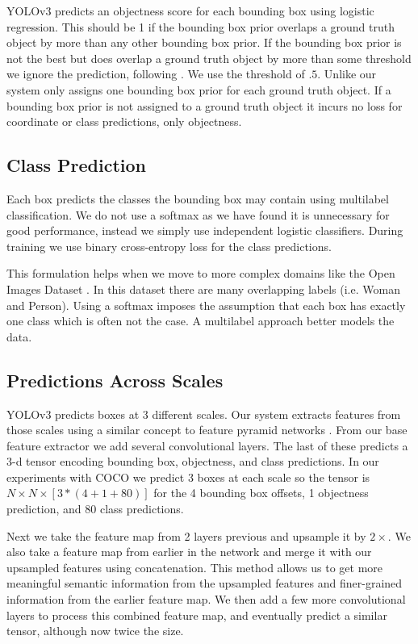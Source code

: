 YOLOv3 predicts an objectness score for each bounding box using logistic regression. This should be 1 if the bounding box prior overlaps a ground truth object by more than any other bounding box prior. If the bounding box prior is not the best but does overlap a ground truth object by more than some threshold we ignore the prediction, following \cite{ren2015faster}. We use the threshold of $.5$. Unlike \cite{ren2015faster} our system only assigns one bounding box prior for each ground truth object. If a bounding box prior is not assigned to a ground truth object it incurs no loss for coordinate or class predictions, only objectness.

\subsection{Class Prediction}

Each box predicts the classes the bounding box may contain using multilabel classification. We do not use a softmax as we have found it is unnecessary for good performance, instead we simply use independent logistic classifiers. During training we use binary cross-entropy loss for the class predictions.

This formulation helps when we move to more complex domains like the Open Images Dataset \cite{openimages}. In this dataset there are many overlapping labels (i.e. Woman and Person). Using a softmax imposes the assumption that each box has exactly one class which is often not the case. A multilabel approach better models the data.

\subsection{Predictions Across Scales}

YOLOv3 predicts boxes at 3 different scales. Our system extracts features from those scales using a similar concept to feature pyramid networks \cite{lin2017feature}. From our base feature extractor we add several convolutional layers. The last of these predicts a 3-d tensor encoding bounding box, objectness, and class predictions. In our experiments with COCO \cite{lin2014microsoft} we predict 3 boxes at each scale so the tensor is $N\times N\times [3*(4+1+80)]$ for the 4 bounding box offsets, 1 objectness prediction, and 80 class predictions.

Next we take the feature map from 2 layers previous and upsample it by $2\times$. We also take a feature map from earlier in the network and merge it with our upsampled features using concatenation. This method allows us to get more meaningful semantic information from the upsampled features and finer-grained information from the earlier feature map. We then add a few more convolutional layers to process this combined feature map, and eventually predict a similar tensor, although now twice the size.

